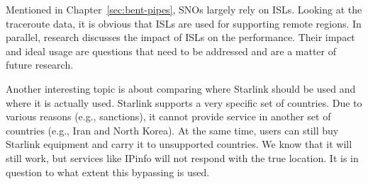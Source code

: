 Mentioned in Chapter~\ref{sec:bent-pipes}, \ac{SNO}s largely rely on \ac{ISL}s.
Looking at the traceroute data, it is obvious that \ac{ISL}s are used for
supporting remote regions. In parallel, research discusses the impact of
\ac{ISL}s on the performance. Their impact and ideal usage are questions that
need to be addressed and are a matter of future research.

Another interesting topic is about comparing where Starlink should be used and
where it is actually used. Starlink supports a very specific set of countries.
Due to various reasons (e.g., sanctions), it cannot provide service in another
set of countries (e.g., Iran and North Korea). At the same time, users can
still buy Starlink equipment and carry it to unsupported countries. We know
that it will still work, but services like IPinfo will not respond with the
true location. It is in question to what extent this bypassing is used.
